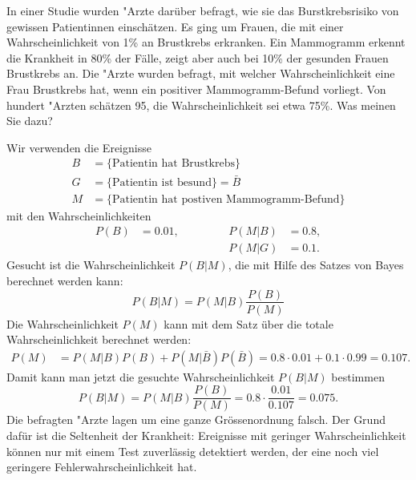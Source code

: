 In einer Studie wurden "Arzte darüber befragt, wie sie das Burstkrebsrisiko
von gewissen Patientinnen einschätzen.
Es ging um Frauen, die mit einer Wahrscheinlichkeit von 1\% an
Brustkrebs erkranken.
Ein Mammogramm erkennt die Krankheit in 80\% der Fälle, zeigt aber auch
bei 10\% der gesunden Frauen Brustkrebs an.
Die "Arzte wurden befragt, mit welcher Wahrscheinlichkeit eine Frau
Brustkrebs hat, wenn ein positiver Mammogramm-Befund vorliegt.
Von hundert "Arzten schätzen 95, die Wahrscheinlichkeit sei etwa 75\%.
Was meinen Sie dazu?


\begin{loesung}
Wir verwenden die Ereignisse
\begin{align*}
B&=\{\text{Patientin hat Brustkrebs}\}\\
G&=\{\text{Patientin ist besund}\} =\bar B\\
M&=\{\text{Patientin hat postiven Mammogramm-Befund}\}
\end{align*}
mit den Wahrscheinlichkeiten
\[
\begin{aligned}
P(B)&=0.01,&&\qquad&P(M|B)&=0.8,\\
    &      &&\qquad&P(M|G)&=0.1.
\end{aligned}
\]
Gesucht ist die Wahrscheinlichkeit $P(B|M)$, die mit Hilfe des Satzes
von Bayes berechnet werden kann:
\[
P(B|M) = P(M|B) \frac{P(B)}{P(M)}
\]
Die Wahrscheinlichkeit $P(M)$ kann mit dem Satz über die totale
Wahrscheinlichkeit berechnet werden:
\begin{align*}
P(M)
&=
P(M|B)P(B)+P(M|\bar B)P(\bar B)
=
0.8\cdot 0.01 + 0.1\cdot 0.99
=
0.107.
\end{align*}
Damit kann man jetzt die gesuchte Wahrscheinlichkeit $P(B|M)$ bestimmen
\[
P(B|M)
=
P(M|B) \frac{P(B)}{P(M)}
=
0.8 \cdot\frac{0.01}{0.107}
=
0.075.
\]
Die befragten "Arzte lagen um eine ganze Grössenordnung falsch.
Der Grund dafür ist die Seltenheit der Krankheit: Ereignisse
mit geringer Wahrscheinlichkeit können nur mit einem Test zuverlässig
detektiert werden, der eine noch viel geringere Fehlerwahrscheinlichkeit hat.
\end{loesung}
